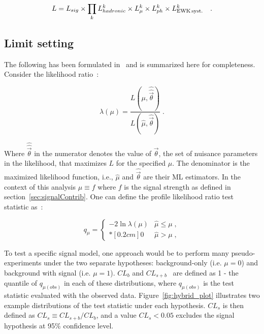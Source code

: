 \begin{equation}
L = L_{sig}\times \prod_k L_{hadronic}^k
\times L_{\mu}^k \times L_{ph}^k \times L_{\rm EWK\, syst.}^k \quad .
\end{equation}

\subsection{Limit setting\label{sec:cls}}

The following has been formulated in~\cite{LairdThesis} and is summarized 
here for completeness. 
Consider the likelihood ratio~\cite{Cowan:2010js}:

\begin{equation}
\label{eq:PLR}
\lambda(\mu) = \frac{ L(\mu,
\hat{\hat{\vec{\theta}}}) } {L(\hat{\mu}, \hat{\vec{\theta}}) } \;.
\end{equation}

Where $\hat{\hat{\vec{\theta}}}$ in the numerator denotes the
value of $\vec{\theta}$, the set of nuisance parameters in the likelihood,
that maximizes $L$ for the specified $\mu$.
The denominator is the maximized likelihood function, i.e., $\hat{\mu}$
and $\hat{\vec{\theta}}$ are their ML estimators. In the context of this
analysis $\mu \equiv f$ where $f$ is the signal strength as defined 
in section~\ref{sec:signalContrib}.  One can define the profile
likelihood ratio test statistic as~\cite{Cowan:2010js}:

\begin{equation}
\label{eq:qmu}
q_{\mu} =
\left\{ \! \! \begin{array}{ll}
               - 2 \ln \lambda(\mu)  & \hat{\mu} \le \mu  \;, \\*[0.2 cm]
               0 & \hat{\mu} > \mu \;,
              \end{array}
       \right.
\end{equation}

To test a specific signal model, one approach would be to perform many 
pseudo-experiments under the two separate hypotheses: background-only 
(i.e. $\mu=0$) and background with signal (i.e. $\mu=1$). $CL_{b}$ and 
$CL_{s+b}$~\cite{read,Junk} are defined as 1 - the quantile of $q_{\mu(obs)}$ in each of 
these distributions, where $q_{\mu(obs)}$ is the test statistic evaluated 
with the observed data. Figure~\ref{fig:hybrid_plot} illustrates two example distributions of
the test statistic under each hypothesis.  $CL_{s}$ is then defined as $CL_{s} \equiv CL_{s+b}/CL_{b}$, 
and a value $CL_{s} < 0.05$ excludes the signal hypothesis at 95\% confidence level. 

